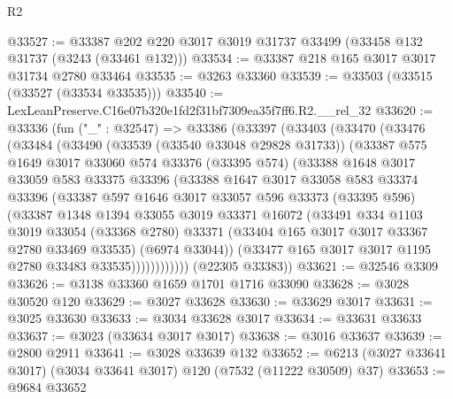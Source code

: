 \begin{lexlean}{R2}
\begin{coremodule}
@33527 := @33387 @202 @220 @3017 @3019 @31737 @33499 (@33458 @132 @31737 (@3243 (@33461 @132)))
@33534 := @33387 @218 @165 @3017 @3017 @31734 @2780 @33464
@33535 := @3263 @33360
@33539 := @33503 (@33515 (@33527 (@33534 @33535)))
@33540 := LexLeanPreserve.C16e07b320e1fd2f31bf7309ea35f7ff6.R2.__rel_32
@33620 := @33336
    (fun ("_" : @32547) =>
    @33386
      (@33397
        (@33403
          (@33470
            (@33476
              (@33484
                (@33490
                  (@33539 (@33540 @33048 @29828 @31733))
                  (@33387
                    @575
                    @1649
                    @3017
                    @33060
                    @574
                    @33376
                    (@33395 @574)
                    (@33388
                      @1648
                      @3017
                      @33059
                      @583
                      @33375
                      @33396
                      (@33388
                        @1647
                        @3017
                        @33058
                        @583
                        @33374
                        @33396
                        (@33387
                          @597
                          @1646
                          @3017
                          @33057
                          @596
                          @33373
                          (@33395 @596)
                          (@33387
                            @1348
                            @1394
                            @33055
                            @3019
                            @33371
                            @16072
                            (@33491
                              @334
                              @1103
                              @3019
                              @33054
                              (@33368 @2780)
                              @33371
                              (@33404 @165 @3017 @3017 @33367 @2780 @33469 @33535)
                              (@6974 @33044))
                            (@33477 @165 @3017 @3017 @1195 @2780 @33483 @33535))))))))))))
      (@22305 @33383))
@33621 := @32546 @3309
@33626 := @3138 @33360 @1659 @1701 @1716 @33090
@33628 := @3028 @30520 @120
@33629 := @3027 @33628
@33630 := @33629 @3017
@33631 := @3025 @33630
@33633 := @3034 @33628 @3017
@33634 := @33631 @33633
@33637 := @3023 (@33634 @3017 @3017)
@33638 := @3016 @33637
@33639 := @2800 @2911
@33641 := @3028 @33639 @132
@33652 := @6213 (@3027 @33641 @3017) (@3034 @33641 @3017) @120 (@7532 (@11222 @30509) @37)
@33653 := @9684 @33652

\end{coremodule}
\end{lexlean}
